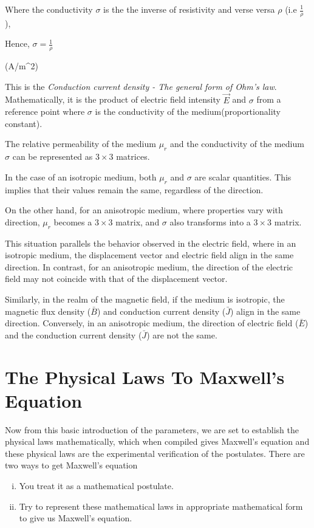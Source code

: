 Where the conductivity $ \sigma $ is the the inverse of resistivity and verse versa $ \rho $ (i.e $ \frac{1}{\rho} $ ), 


Hence, $ \sigma = \frac{1}{\rho}$

\quad (A/m^{2})


This is the \emph{Conduction current density - The general form of Ohm's law}. Mathematically, it is the product of electric field intensity $\vec{E}$ and $\sigma$ from a reference point where $\sigma$ is the conductivity of the medium(proportionality constant).

The relative permeability of the medium \( \mu_r \) and the conductivity of the medium \( \sigma \) can be represented as \( 3 \times 3 \) matrices.

In the case of an isotropic medium, both \( \mu_r \) and \( \sigma \) are scalar quantities. This implies that their values remain the same, regardless of the direction.

On the other hand, for an anisotropic medium, where properties vary with direction, \( \mu_r \) becomes a \( 3 \times 3 \) matrix, and \( \sigma \) also transforms into a \( 3 \times 3 \) matrix.

This situation parallels the behavior observed in the electric field, where in an isotropic medium, the displacement vector and electric field align in the same direction. In contrast, for an anisotropic medium, the direction of the electric field may not coincide with that of the displacement vector.

Similarly, in the realm of the magnetic field, if the medium is isotropic, the magnetic flux density (\( \bar{B} \)) and conduction current density (\( \bar{J} \)) align in the same direction. Conversely, in an anisotropic medium, the direction of electric field (\( \bar{E} \)) and the conduction current density (\( \bar{J} \)) are not the same.




\section{The Physical Laws To Maxwell's Equation}
Now from this basic introduction of the parameters, we are set to establish the physical laws mathematically, which when compiled gives Maxwell's equation and these physical laws are the experimental verification of the postulates. There are two ways to get Maxwell's equation
\begin{enumerate}[(i)]
\item You treat it as a mathematical postulate.
\item Try to represent these mathematical laws in appropriate mathematical form to give us Maxwell's equation.
\end{enumerate}

